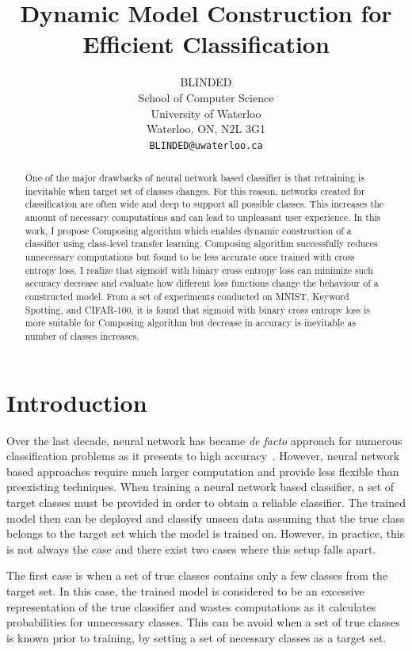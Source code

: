 \documentclass{article}
\title{Dynamic Model Construction for Efficient Classification}
\author{
    BLINDED \\
    School of Computer Science\\
    University of Waterloo\\
    Waterloo, ON, N2L 3G1 \\
    \texttt{BLINDED@uwaterloo.ca} \\
}
\begin{document}
\maketitle

\begin{abstract}

One of the major drawbacks of neural network based classifier is that retraining is inevitable when target set of classes changes. For this reason, networks created for classification are often wide and deep to support all possible classes. This increases the amount of necessary computations and can lead to unpleasant user experience. In this work, I propose Composing algorithm which enables dynamic construction of a classifier using class-level transfer learning. Composing algorithm successfully reduces unnecessary computations but found to be less accurate once trained with cross entropy loss. I realize that sigmoid with binary cross entropy loss can minimize such accuracy decrease and evaluate how different loss functions change the behaviour of a constructed model. From a set of experiments conducted on MNIST, Keyword Spotting, and CIFAR-100, it is found that sigmoid with binary cross entropy loss is more suitable for Composing algorithm but decrease in accuracy is inevitable as number of classes increases.

\end{abstract}

\section{Introduction}

Over the last decade, neural network has became {\it de facto} approach for numerous classification problems as it presents to high accuracy~\cite{lecun1998gradient, chen2014small, krizhevsky2009learning}. However, neural network based approaches require much larger computation and provide less flexible than preexisting techniques. When training a neural network based classifier, a set of target classes must be provided in order to obtain a reliable classifier. The trained model then can be deployed and classify unseen data assuming that the true class belongs to the target set which the model is trained on. However, in practice, this is not always the case and there exist two cases where this setup falls apart.

The first case is when a set of true classes contains only a few classes from the target set. In this case, the trained model is considered to be an excessive representation of the true classifier and wastes computations as it calculates probabilities for unnecessary classes. This can be avoid when a set of true classes is known prior to training, by setting a set of necessary classes as a target set.
\end{document}
